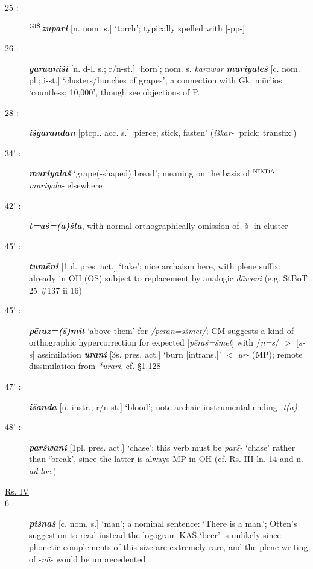\documentclass[10pt]{article}
\newcommand{\supersc}[1]{$^{\textrm{\scriptsize{#1}}}$}  	%
\newcommand{\bit}[1]{\textbf{\textit{#1}}}				%
\newcommand{\p}[1]{{\tiny[{#1}]}}					%
\newcommand{\pr}{\'{ }}									%
\newcommand{\hith}{\textsubwedge{h}}
\newcommand{\wood}{\supersc{GI\v{S}}}
\newcommand{\bread}{\supersc{NINDA}}
\renewcommand{\.}[1]{\textsubdot{#1}}
\begin{document}
\begin{description}
\item[25 :] \textbf{\wood}\bit{zupari} \p{n. nom. s.} `torch'; typically spelled with [-pp-]

\item[26 :] \bit{garauni\v{s}i} \p{n. d-l. s.; r/n-st.} `horn'; nom. s. \textit{karawar} \bit{muriyale\v{s}} \p{c. nom. pl.; i-st.} `clusters/bunches of grapes'; a connection with Gk. {\greektext m\=ur'ios} `countless; 10,000', though see objections of P. 

\item[28 :] \bit{i\v{s}garandan} \p{ptcpl. acc. s.} `pierce; stick, fasten'  (\textit{i\v{s}kar}-  `prick; transfix')

\item[34{\pr} :] \bit{muriyala\v{s}} `grape(-shaped) bread'; meaning on the basis of {\bread}\textit{muriyala-} elsewhere

\item[42{\pr} :] \bit{t=u\v{s}=(a)\v{s}ta}, with normal orthographically omission of -\v{s}- in cluster

\item[45{\pr} :] \bit{tum\=eni} \p{1pl. pres. act.} `take'; nice archaism here, with plene suffix; already in OH (OS) subject to replacement by analogic \textit{d\=aweni} (e.g. StBoT 25 \#137 ii 16)

\item[45{\pr} :] \bit{p\=eraz=(\v{s})mit} `above them' for \textit{/p\=eran=s\v{s}met/}; CM suggests a kind of orthographic hypercorrection for expected [\textit{p\=era\v{s}=\v{s}met}] with /\textit{n=s}/ $>$ [\textit{s-s}] assimilation  \bit{ur\=ani} \p{3s. pres. act.} `burn \p{intrans.}' $<$ \textit{ur-} (MP); remote dissimilation from \textit{*ur\=ari}, cf.  \S1.128

\item[47{\pr} :] \bit{i\v{s}{\hith}anda} \p{n. instr.; r/n-st.} `blood'; note archaic instrumental ending \textit{-t(a)}

\item[48{\pr} :] \bit{par\v{s}wani} \p{1pl. pres. act.} `chase'; this verb must be \textit{par\v{s}-} `chase' rather than `break', since the latter is always MP in OH (cf. Rs. III ln. 14 and n. \textit{ad loc.})

\item[\underline{Rs. IV}]

\item[6 :] \bit{pi\v{s}n\=a\v{s}} \p{c. nom. s.} `man'; a nominal sentence: `There is a man.'; Otten's suggestion to read instead the logogram KA\v{S} `beer' is unlikely since phonetic complements of this size are extremely rare, and the plene writing of -\textit{n\=a}- would be unprecedented


\end{description}
\end{document}
